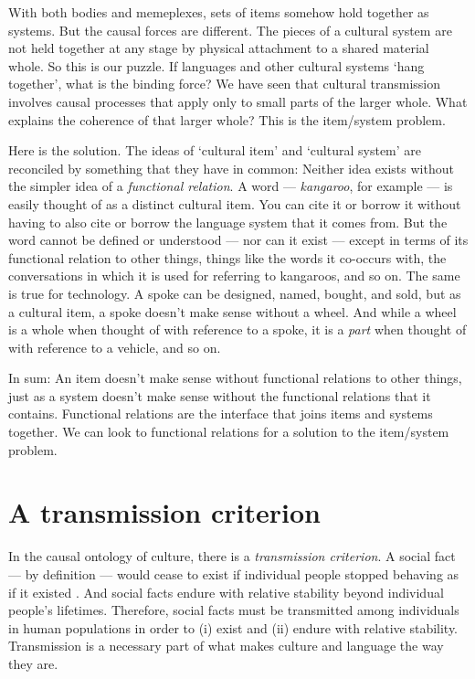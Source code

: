 With both bodies and memeplexes, sets of items somehow hold together as systems. But the causal forces are different. The pieces of a cultural system are not held together at any stage by physical 
attachment to a shared material whole. So this is our puzzle. If 
languages and other cultural systems \textquoteleft hang together', what is the 
binding force? We have seen that cultural transmission involves causal processes that 
apply only to small parts of the larger whole. What explains the 
coherence of that larger whole? This is the item/system problem.



Here is the solution. The ideas of \textquoteleft cultural item' 
and \textquoteleft cultural system' are reconciled by something that they have in 
common: Neither idea exists without the simpler idea of a \textit{
functional relation}. A word --- \textit{kangaroo}, for example --- is easily thought of as a 
distinct cultural item. You can cite it or borrow it without having to 
also cite or borrow the language system that it comes from. But the word 
cannot be defined or understood --- nor can it exist --- except in terms of its 
functional relation to other things, things like the words it co-occurs 
with, the conversations in which it is used for referring to kangaroos, 
and so on. The same is true for technology. A spoke can be designed, named, bought, and sold, 
but as a cultural item, a spoke doesn't make sense without a wheel. And 
while a wheel is a whole when thought of with reference to a spoke, it 
is a \textit{part} when thought of with reference to a vehicle, and so 
on. 



In sum: An item doesn't make sense without functional relations to other 
things, just as a system doesn't make sense without the functional 
relations that it contains. Functional relations are the interface that 
joins items and systems together. We can look to functional relations for a solution 
to the item/system problem.

\section{A transmission criterion}

In the causal ontology of culture, there is a \textit{transmission 
criterion}. A social fact --- by definition --- would cease to exist if 
individual people stopped behaving as if it existed \citep{searle_making_2010}. And social facts 
endure with relative stability beyond individual people's lifetimes. Therefore, social facts must be transmitted among individuals in human 
populations in order to (i) exist and (ii) endure with relative 
stability. Transmission is a necessary part of what makes culture and 
language the way they are. 



